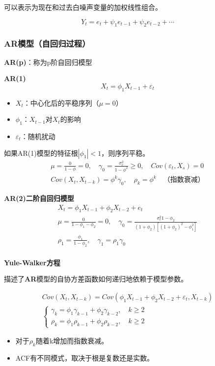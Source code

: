 \documentclass{article} %
\begin{document}
可以表示为现在和过去白噪声变量的加权线性组合。

\[Y_t=e_t+\psi_1 e_{t-1} +\psi_2 e_{t-2} + \cdots\]

\subsubsection{AR模型（自回归过程）}
\textbf{AR(p)}：称为p阶自回归模型

\textbf{AR(1)}
\[
X_t=\phi_1 X_{t-1}+\varepsilon_t
\]

\begin{itemize}
\item $X_t$：中心化后的平稳序列（$\mu=0$）
\item $\phi_1$：$X_{t-1}$对$X_t$的影响
\item $\varepsilon_t$：随机扰动
\end{itemize}

如果AR(1)模型的特征根\(|\phi_1|<1\)，则序列平稳。
\[
  \begin{gathered}
\mu=\frac{0}{1-\phi}=0,\quad \gamma_0=\frac{\sigma^2_e}{1-\phi^2}\geq 0,\quad Cov(\varepsilon_t,X_s)=0 \\
  Cov(X_t,X_{t-k})=\phi^k \gamma_0 ,\quad \rho_k=\phi^k \quad \text{（指数衰减）}
\end{gathered}
\]

\textbf{AR(2)二阶自回归模型}
\[
  \begin{gathered}
  X_t=\phi_1 X_{t-1}+\phi_2 X_{t-2}+e_t\\
  \mu=\frac{0}{1-\phi_1-\phi_2}=0,\quad \gamma_0=\frac{\sigma^2_e 1-\phi_2}{(1+\phi_2)[(1+\phi_2)^2-\phi_1^2]} \\
  \rho_1=\frac{\phi_1}{1-\phi_2},\quad \gamma_1=\rho_1\gamma_0\\
  \end{gathered}
\]

\textbf{Yule-Walker方程}

描述了\textbf{AR}模型的自协方差函数如何递归地依赖于模型参数。

\[
  \begin{gathered}
    Cov(X_t,X_{t-k})=Cov(\phi_1 X_{t-1}+\phi_2 X_{t-2}+\varepsilon_t,X_{t-k})\\
    \begin{cases} \gamma_k=\phi_1\gamma_{k-1}+\phi_2\gamma_{k-2},\quad k\geq 2\\
      \rho_k=\phi_1\rho_{k-1}+\phi_2\rho_{k-2},\quad k\geq 2
    \end{cases}
    \end{gathered}
\]
\begin{itemize}
  \item 对于\(\rho_k\)随着k增加而指数衰减。
  \item ACF有不同模式，取决于根是复数还是实数。
\end{itemize}
\end{document}
